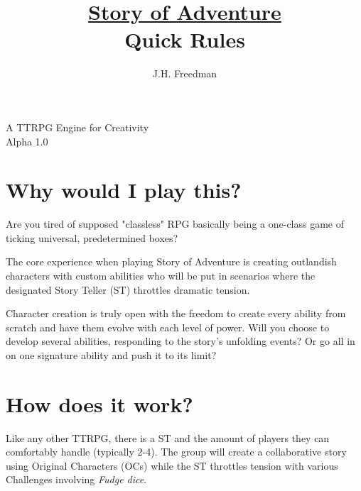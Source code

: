 \documentclass[statementpaper,oneside,article,12pt]{memoir}
\newcommand{\BackgroundPic}[1]{%
	\put(0,0){%
		\parbox[b][\paperheight]{\paperwidth}{%
			\vfill
			\centering
			{\transparent{0.4} \texttt{[image: \#1]}}%
			\vfill
}}}
\begin{document}
	
	
	\title{\underline{Story of Adventure}\\Quick Rules}
	\author{J.H. Freedman}
	\date{}
	
	\begingroup
	\let\cleardoublepage\clearpage
	
	
	\begin{titlingpage}
		\maketitle
	
		\vspace*{\fill}
		A TTRPG Engine for Creativity\\Alpha 1.0
		
	\end{titlingpage}
	
	\endgroup
	
	\pagestyle{empty}
	
	
	
	\section*{Why would I play this?}
	Are you tired of supposed "classless" RPG basically being a one-class game of ticking universal, predetermined boxes?
	
	The core experience when playing Story of Adventure is creating outlandish characters with custom abilities who will be put in scenarios where the designated Story Teller (ST) throttles dramatic tension.
	
	Character creation is truly open with the freedom to create every ability from scratch and have them evolve with each level of power. Will you choose to develop several abilities, responding to the story's unfolding events? Or go all in on one signature ability and push it to its limit?
	
	\section*{How does it work?}
	Like any other TTRPG, there is a ST and the amount of players they can comfortably handle (typically 2-4). The group will create a collaborative story using Original Characters (OCs) while the ST throttles tension with various Challenges involving \textit{Fudge dice}. 
	
\end{document}
